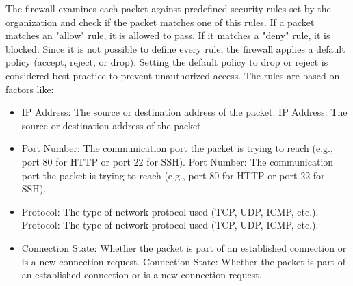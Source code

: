 %
\vspace{2ex} \newline 
The firewall examines each packet against predefined security rules set by the organization and check 
if the packet matches one of this rules. 
If a packet matches an "allow" rule, it is allowed to pass. If it matches a "deny" rule, it is blocked. 
Since it is not possible to define every rule, the firewall applies a default policy (accept, reject, or drop). 
Setting the default policy to drop or reject is considered best practice to prevent unauthorized access.
\vspace{2ex} \newline 
The rules are based on factors like: 
\begin{itemize}
    \item IP Address: The source or destination address of the packet. 
    IP Address: The source or destination address of the packet.
    \item Port Number: The communication port the packet is trying to reach 
    (e.g., port 80 for HTTP or port 22 for SSH). 
    Port Number: The communication port the packet is trying to reach (e.g., port 80 for HTTP or port 22 for SSH).
    \item Protocol: The type of network protocol used (TCP, UDP, ICMP, etc.). 
    Protocol: The type of network protocol used (TCP, UDP, ICMP, etc.).
    \item Connection State: Whether the packet is part of an established connection or is a 
    new connection request. 
    Connection State: Whether the packet is part of an established connection or is a new connection request.
\end{itemize} 

